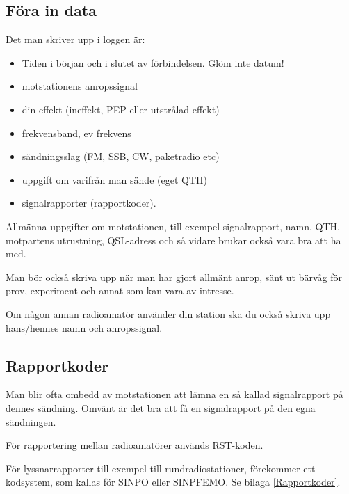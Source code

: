 \newpage

\subsection{Föra in data}

Det man skriver upp i loggen är:
\begin{itemize}
  \item Tiden i början och i slutet av förbindelsen. Glöm inte datum!
  \item motstationens anropssignal
  \item din effekt (ineffekt, PEP eller utstrålad effekt)
  \item frekvensband, ev frekvens
  \item sändningsslag (FM, SSB, CW, paketradio etc)
  \item uppgift om varifrån man sände (eget QTH)
  \item signalrapporter (rapportkoder).
\end{itemize}

Allmänna uppgifter om motstationen, till exempel signalrapport, namn, QTH,
motpartens utrustning, QSL-adress och så vidare brukar också vara bra att ha med.

Man bör också skriva upp när man har gjort allmänt anrop, sänt ut
bärvåg för prov, experiment och annat som kan vara av intresse.

Om någon annan radioamatör använder din station ska du också skriva
upp hans/hennes namn och anropssignal.

\subsection{Rapportkoder}

Man blir ofta ombedd av motstationen att lämna en så kallad signalrapport på
dennes sändning.
Omvänt är det bra att få en signalrapport på den egna sändningen.

För rapportering mellan radioamatörer används RST-koden.

För lyssnarrapporter till exempel till rundradiostationer, förekommer ett
kodsystem, som kallas för SINPO eller SINPFEMO. Se bilaga \ref{Rapportkoder}.

